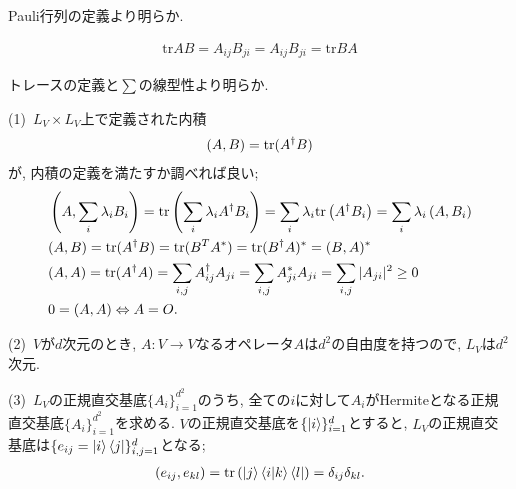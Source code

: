 \begin{ex}
    \label{ex2.36}
    Pauli行列の定義より明らか.
\end{ex}

\begin{ex}
    \label{ex2.37}
    \begin{align*}
        \mathrm{tr}{AB} = A_{ij}B_{ji} =  A_{ij}B_{ji} = \mathrm{tr}{BA}
    \end{align*}
\end{ex}

\begin{ex}
    \label{ex2.38}
    トレースの定義と$\sum$の線型性より明らか.
\end{ex}

\begin{ex}
    \label{ex2.39}
    (1)\
    $L_V \times L_V$上で定義された内積
    \begin{align*}
        \left( A, B\right) = \mathrm{tr}(A^\dagger B)
    \end{align*}
    が, 内積の定義を満たすか調べれば良い;
    \begin{align*}
         & \left( A, \sum_i \lambda_i B_i \right)
        =
        \mathrm{tr}\left(\sum_i \lambda_i A^\dagger B_i \right)
        =
        \sum_i \lambda_i  \mathrm{tr} \left(A^\dagger B_i \right)
        =
        \sum_i \lambda_i  \left( A, B_i \right)
        \\
         & (A, B) = \mathrm{tr}(A^\dagger B) = \mathrm{tr}( B^T A^*) = \mathrm{tr}( B^\dagger A)^* = (B, A)^*
        \\
         &
        (A,A) = \mathrm{tr}(A^\dagger A)
        =
        \sum_{i,j} A^\dagger_{ij} A_{ji}
        =
        \sum_{i,j} A^*_{ji} A_{ji}
        =
        \sum_{i,j} | A_{ji}|^2
        \geq 0
        \\
         &
        0 = (A,A) \Leftrightarrow A = O .
    \end{align*}
    \par
    (2)\ $V$が$d$次元のとき, $A: V \to V$なるオペレータ$A$は$d^2$の自由度を持つので,
    $L_V$は$d^2$次元.
    \par
    (3)\ $L_V$の正規直交基底$\{A_i\}_{i=1}^{d^2}$のうち, 全ての$i$に対して$A_i$がHermiteとなる正規直交基底$\{A_i\}_{i=1}^{d^2}$を求める. $V$の正規直交基底を$\{\ket{i}\}_{i=1}^{d}$とすると, $L_V$の正規直交基底は$\{e_{ij}=\ket{i} \bra{j}\}_{i,j=1}^{d}$となる;
    \begin{align*}
        \left( e_{ij}, e_{kl} \right) = \mathrm{tr}\left(\ket{j} \braket{i|k} \bra{l} \right) = \delta_{ij} \delta_{kl}.
    \end{align*}

\end{ex}
